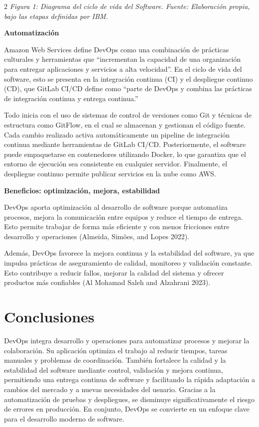 \documentclass[10pt,spanish,Letterpaper,openany]{book}
\let\origtextbf\textbf
\renewcommand{\textbf}[1]{{\color{textlinetitle}\origtextbf{#1}}}
\begin{document}
\begin {multicols}{2}
\emph{Figura 1: Diagrama del ciclo de vida del Software. Fuente: Elaboración propia, bajo las etapas definidas por IBM.}

\textbf{Automatización}

Amazon Web Services define DevOps como una combinación de prácticas culturales y herramientas que ``incrementan la capacidad de una organización para entregar aplicaciones y servicios a alta velocidad''. En el ciclo de vida del software, esto se presenta en la integración continua (CI) y el despliegue continuo (CD), que GitLab CI/CD define como ``parte de DevOps y combina las prácticas de integración continua y entrega continua.''

Todo inicia con el uso de sistemas de control de versiones como Git y técnicas de estructura como GitFlow, en el cual se almacenan y gestionan el código fuente. Cada cambio realizado activa automáticamente un pipeline de integración continua mediante herramientas de GitLab CI/CD. Posteriormente, el software puede empaquetarse en contenedores utilizando Docker, lo que garantiza que el entorno de ejecución sea consistente en cualquier servidor. Finalmente, el despliegue continuo permite publicar servicios en la nube como AWS.

\textbf{Beneficios: optimización, mejora, estabilidad}

DevOps aporta optimización al desarrollo de software porque automatiza procesos, mejora la comunicación entre equipos y reduce el tiempo de entrega. Esto permite trabajar de forma más eficiente y con menos fricciones entre desarrollo y operaciones (Almeida, Simões, and Lopes 2022).

Además, DevOps favorece la mejora continua y la estabilidad del software, ya que impulsa prácticas de aseguramiento de calidad, monitoreo y validación constante. Esto contribuye a reducir fallos, mejorar la calidad del sistema y ofrecer productos más confiables (Al Mohamad Saleh and Alzahrani 2023).

\section{Conclusiones}\label{conclusiones-3}

DevOps integra desarrollo y operaciones para automatizar procesos y mejorar la colaboración. Su aplicación optimiza el trabajo al reducir tiempos, tareas manuales y problemas de coordinación. También fortalece la calidad y la estabilidad del software mediante control, validación y mejora continua, permitiendo una entrega continua de software y facilitando la rápida adaptación a cambios del mercado y a nuevas necesidades del usuario. Gracias a la automatización de pruebas y despliegues, se disminuye significativamente el riesgo de errores en producción. En conjunto, DevOps se convierte en un enfoque clave para el desarrollo moderno de software.


\end{multicols}
\end{document}
